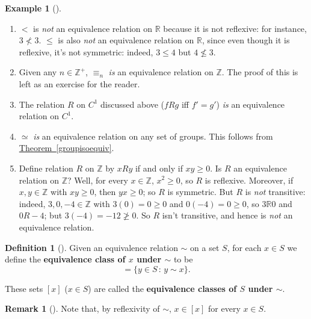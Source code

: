 \documentclass[10pt,]{book}
\newcommand{\terminology}[1]{\textbf{#1}}
\theoremstyle{plain}
\theoremstyle{definition}
\newtheorem{definition}[theorem]{Definition}
\theoremstyle{definition}
\newtheorem{remark}[theorem]{Remark}
\theoremstyle{definition}
\newtheorem{example}[theorem]{Example}
\theoremstyle{definition}
\numberwithin{equation}{section}
\def\Z{\mathbb{Z}}
\def\R{\mathbb{R}}
\newcommand{\lt}{<}
\begin{document}
\begin{example}[]\label{example-65}
\leavevmode%
\begin{enumerate}
\item\hypertarget{li-397}{}\(\lt\) is \emph{not} an equivalence relation on \(\R\) because it is not reflexive: for instance, \(3\not\lt  3\). \(\leq\) is also \emph{not} an equivalence relation on \(\R\), since even though it is reflexive, it's not symmetric: indeed, \(3\leq 4\) but \(4\not\leq 3\).%
\item\hypertarget{li-398}{}Given any \(n\in \Z^+\), \(\equiv_n\) \emph{is} an equivalence relation on \(\Z\).  The proof of this is left as an exercise for the reader.%
\item\hypertarget{li-399}{}The relation \(R\) on \(C^1\) discussed above (\(fR  g\) iff \(f'=g'\)) \emph{is} an equivalence relation on \(C^1\).%
\item\hypertarget{li-400}{}\(\simeq\) \emph{is} an equivalence relation on any set of groups. This follows from \hyperref[groupisoequiv]{Theorem~\ref{groupisoequiv}}.%
\item\hypertarget{li-401}{}Define relation \(R\) on \(\Z\) by \(xR y\) if and only if \(xy
\geq 0\).  Is \(R\) an equivalence relation on \(\Z\)?  Well, for every \(x\in \Z\), \(x^2\geq 0\), so \(R\) is reflexive.  Moreover, if \(x,y\in
\Z\) with \(xy \geq 0\), then \(yx \geq 0\); so \(R\) is symmetric.  But \(R\) is \emph{not} transitive: indeed, \(3,0,-4\in \Z\) with \(3(0)=0
\geq 0\) and \(0(-4)=0\geq 0\), so \(3\R 0\) and \(0 R -4\); but \(3(-4)=-12 \not \geq 0\).  So \(R\) isn't transitive, and hence is \emph{not} an equivalence relation.%
\end{enumerate}
\end{example}
\begin{definition}[{}]\label{definition-58}
Given an equivalence relation \(\sim\) on a set \(S\), for each \(x\in S\) we define the \terminology{equivalence class of \(x\) under \(\sim\)} to be%
\begin{equation*}
[x]=\{y\in S\,:\, y\sim x\}.
\end{equation*}
%
\par
These sets \([x]\) (\(x\in S\)) are called the \terminology{equivalence classes of \(S\) under \(\sim\)}.%
\label{notation-33}
\end{definition}
\begin{remark}[]\label{remark-35}
Note that, by reflexivity of \(\sim\), \(x\in [x]\) for every \(x\in S\).%
\end{remark}
\end{document}
